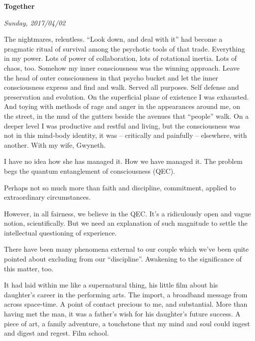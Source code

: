 

\centerline{\bf Together}
\centerline{\it Sunday, 2017/04/02}



\vfill
\break



﻿The nightmares, relentless.  ``Look down, and deal with it'' had
become a pragmatic ritual of survival \break among the psychotic tools of
that trade.  Everything in my power.  Lots of power of collaboration,
lots of rotational inertia.  Lots of chaos, too.  Somehow my inner
consciousness was the winning approach.  Leave the head of outer
consciousness in that psycho bucket and let the inner consciousness
express and find and walk.  Served all purposes.  Self defense and
preservation and evolution.  On the superficial plane of existence I
was exhausted.  And toying with methods of rage and anger in the
appearances around me, on the street, in the mud of the gutters beside
the avenues that ``people'' walk.  On a deeper level I was productive
and restful and living, but the consciousness was not in this
mind-body identity, it was -- critically and painfully -- elsewhere,
with another.  With my wife, Gwyneth.


I have no idea how she has managed it.  How we have managed it.  The
problem begs the quantum entanglement of consciousness (QEC).


Perhaps not so much more than faith and discipline, commitment,
applied to extraordinary circumstances.


However, in all fairness, we believe in the QEC.  It's a ridiculously
open and vague notion, scientifically.  But we need an explanation of
such magnitude to settle the intellectual questioning of experience.


There have been many phenomena external to our couple which we've been
quite pointed about excluding from our ``discipline''.  Awakening to
the significance of this matter, too.

\bye

\vfill
\break



﻿It had laid within me like a supernatural thing, his little film about
his daughter's career in the performing arts.  The import, a broadband
message from across space-time.  A point of contact precious to me,
and substantial.  More than having met the man, it was a father's wish
for his daughter's future success.  A piece of art, a family
adventure, a touchstone that my mind and soul could ingest and digest
and regest.  Film school.



